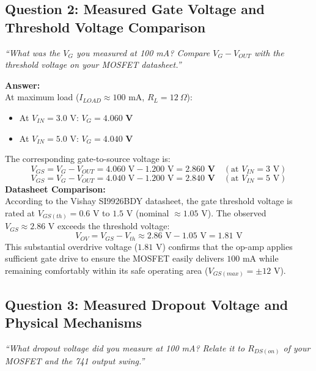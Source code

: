 \documentclass[11pt,a4paper]{article}
\begin{document}
\subsection{Question 2: Measured Gate Voltage and Threshold Voltage Comparison}
\textit{``What was the $V_G$ you measured at 100 mA? Compare $V_G - V_{OUT}$ with the threshold voltage on your MOSFET datasheet.''}

\textbf{Answer:}\\
At maximum load ($I_{LOAD} \approx 100\text{ mA}$, $R_L = 12\ \Omega$):
\begin{itemize}
    \item At $V_{IN} = 3.0\text{ V}$: $V_G = \mathbf{4.060\text{ V}}$
    \item At $V_{IN} = 5.0\text{ V}$: $V_G = \mathbf{4.040\text{ V}}$
\end{itemize}
The corresponding gate-to-source voltage is:
\begin{equation}
    V_{GS} = V_G - V_{OUT} = 4.060\text{ V} - 1.200\text{ V} = \mathbf{2.860\text{ V}} \quad (\text{at } V_{IN} = 3\text{ V})
\end{equation}
\begin{equation}
    V_{GS} = V_G - V_{OUT} = 4.040\text{ V} - 1.200\text{ V} = \mathbf{2.840\text{ V}} \quad (\text{at } V_{IN} = 5\text{ V})
\end{equation}
\textbf{Datasheet Comparison:}\\
According to the Vishay SI9926BDY datasheet, the gate threshold voltage is rated at $V_{GS(th)} = 0.6\text{ V}$ to $1.5\text{ V}$ (nominal $\approx 1.05\text{ V}$). The observed $V_{GS} \approx 2.86\text{ V}$ exceeds the threshold voltage:
\begin{equation}
    V_{OV} = V_{GS} - V_{th} \approx 2.86\text{ V} - 1.05\text{ V} = 1.81\text{ V}
\end{equation}
This substantial overdrive voltage ($1.81\text{ V}$) confirms that the op-amp applies sufficient gate drive to ensure the MOSFET easily delivers $100\text{ mA}$ while remaining comfortably within its safe operating area ($V_{GS(max)} = \pm 12\text{ V}$).

\subsection{Question 3: Measured Dropout Voltage and Physical Mechanisms}
\textit{``What dropout voltage did you measure at 100 mA? Relate it to $R_{DS(on)}$ of your MOSFET and the 741 output swing.''}
\end{document}
